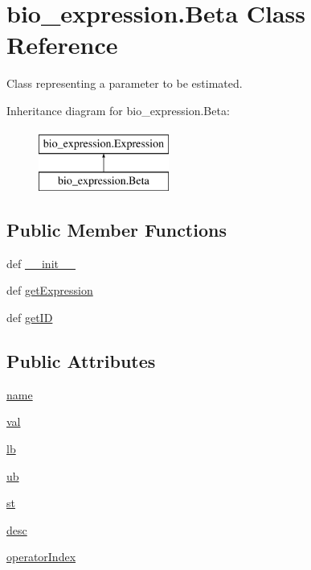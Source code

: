 \hypertarget{classbio__expression_1_1_beta}{\section{bio\+\_\+expression.\+Beta Class Reference}
\label{classbio__expression_1_1_beta}
}


Class representing a parameter to be estimated.  


Inheritance diagram for bio\+\_\+expression.\+Beta\+:\begin{figure}[H]
\begin{center}
\leavevmode
\includegraphics[height=2.000000cm]{d7/da1/classbio__expression_1_1_beta}
\end{center}
\end{figure}
\subsection*{Public Member Functions}
\begin{DoxyCompactItemize}
\item 
def \hyperlink{classbio__expression_1_1_beta_a5f6dba2d51c7d2b4ac93f7fe0fb0a789}{\+\_\+\+\_\+init\+\_\+\+\_\+}
\item 
def \hyperlink{classbio__expression_1_1_beta_a974d6436cd733422c07670a3650a7366}{get\+Expression}
\item 
def \hyperlink{classbio__expression_1_1_beta_aafcc5ad23acfd743f7a1d31a2050f8dc}{get\+I\+D}
\end{DoxyCompactItemize}
\subsection*{Public Attributes}
\begin{DoxyCompactItemize}
\item 
\hyperlink{classbio__expression_1_1_beta_ae40aca026321dc4873216baea65c209a}{name}
\item 
\hyperlink{classbio__expression_1_1_beta_af9ff8e36aac16ad655894d20003fb8af}{val}
\item 
\hyperlink{classbio__expression_1_1_beta_a7709223a6780122c4dd1f17516b53f5c}{lb}
\item 
\hyperlink{classbio__expression_1_1_beta_a0923a6e1480c5747a7eecae9a23ca6ad}{ub}
\item 
\hyperlink{classbio__expression_1_1_beta_a7789b899e6f1bb2186387f234f48ca30}{st}
\item 
\hyperlink{classbio__expression_1_1_beta_aad1a82e31c5f2389dfac1e4358265ea4}{desc}
\item 
\hyperlink{classbio__expression_1_1_beta_a7435b0e78fc4790d737438a508dda221}{operator\+Index}
\end{DoxyCompactItemize}


